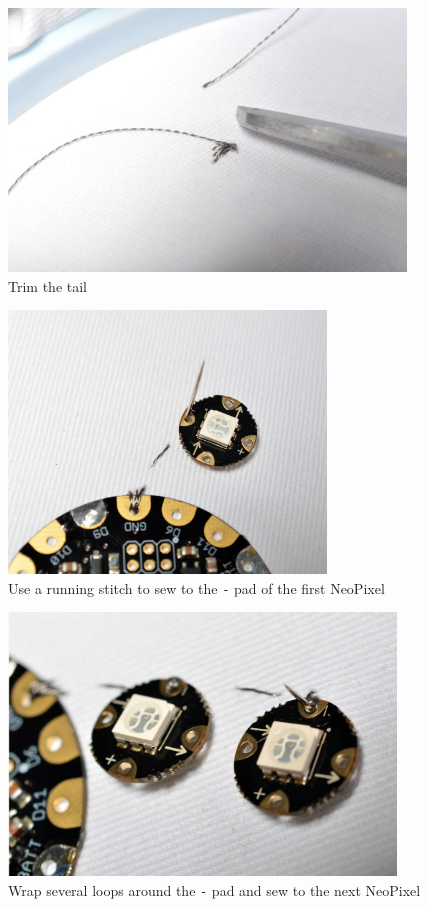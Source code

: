 \documentclass[letterpaper,twoside,12pt]{article}
\begin{document}
\begin{figure}[hbpt]\begin{centering}%
\includegraphics[height=2.75in]{flora_DSC_0111.jpg}
\caption{Trim the tail}
\label{fig:flora_DSC_0111}
\end{centering}\end{figure}
\begin{figure}[hbpt]\begin{centering}%
\includegraphics[height=2.75in]{flora_DSC_0113.jpg}
\caption{Use a running stitch to sew to the \texttt{-} pad of the first NeoPixel}
\label{fig:flora_DSC_0113}
\end{centering}\end{figure}
\begin{figure}[hbpt]\begin{centering}%
\includegraphics[height=2.75in]{flora_DSC_0115.jpg} 
\caption{Wrap several loops around the \texttt{-} pad and sew to the next NeoPixel}
\label{fig:flora_DSC_0115}
\end{centering}\end{figure}
\end{document}
